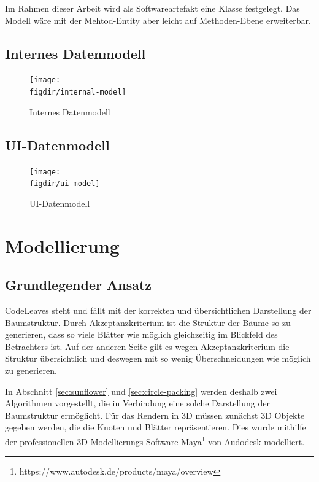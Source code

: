 Im Rahmen dieser Arbeit wird als Softwareartefakt eine Klasse festgelegt. Das Modell wäre mit der Mehtod-Entity aber leicht auf Methoden-Ebene erweiterbar. 

\section{Internes Datenmodell}
\label{sec:hierarchical-model}

\begin{figure}[htb]
  \texttt{[image: \\figdir/internal-model]}
  \caption{Internes Datenmodell}
  \label{fig:internal-model}
\end{figure}

\section{UI-Datenmodell}
\label{sec:hierarchical-model}

\begin{figure}[htb]
  \texttt{[image: \\figdir/ui-model]}
  \caption{UI-Datenmodell}
  \label{fig:ui-model}
\end{figure}

\chapter{Modellierung}
\label{ch:modelling}

\section{Grundlegender Ansatz}

CodeLeaves steht und fällt mit der korrekten und übersichtlichen Darstellung der Baumstruktur. Durch Akzeptanzkriterium  ist die Struktur der Bäume so zu generieren, dass so viele Blätter wie möglich gleichzeitig im Blickfeld des Betrachters ist. Auf der anderen Seite gilt es wegen Akzeptanzkriterium  die Struktur übersichtlich und deswegen mit so wenig Überschneidungen wie möglich zu generieren.

In Abschnitt \ref{sec:sunflower} und \ref{sec:circle-packing} werden deshalb zwei Algorithmen vorgestellt, die in Verbindung eine solche Darstellung der Baumstruktur ermöglicht. Für das Rendern in 3D müssen zunächst 3D Objekte gegeben werden, die die Knoten und Blätter repräsentieren. Dies wurde mithilfe der professionellen 3D Modellierungs-Software Maya\footnote{https://www.autodesk.de/products/maya/overview} von Audodesk modelliert.

